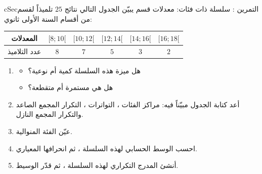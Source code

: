 \documentclass[12pt,a4paper]{article}
\newenvironment{BOX}[2]{\begin{otherlanguage}{english}\begin{arbox}{#1}{#2}}{\end{arbox}\end{otherlanguage}}
\newcounter{exo}
\newenvironment{tamrin}[1]{\stepcounter{exo}\begin{BOX}{cSec}{التمرين \theexo: #1}}{\end{BOX}}
\newenvironment{sq}{\begin{itemize}[leftmargin=2.4em,itemsep=3pt]}{\end{itemize}}
\newcommand{\qa}{\item[(أ)]}\newcommand{\qb}{\item[(ب)]}\newcommand{\qc}{\item[(جـ)]}\newcommand{\qd}{\item[(د)]}\newcommand{\qe}{\item[(هـ)]}
\begin{document}
\begin{tamrin}{سلسلة ذات فئات: معدلات قسم}
يبيّن الجدول التالي نتائج $25$ تلميذاً لقسم من أقسام السنة الأولى ثانوي:
\begin{center}
\renewcommand{\arraystretch}{1.45}
\begin{tabular}{|c|c|c|c|c|c|}\hline
\cellcolor{cSec!12}المعدلات & $[8;10[$ & $[10;12[$ & $[12;14[$ & $[14;16[$ & $[16;18[$\\\hline
\cellcolor{cSec!12}عدد التلاميذ & $8$ & $7$ & $5$ & $3$ & $2$\\\hline
\end{tabular}
\end{center}
\begin{enumerate}
\item
\begin{sq}
\qa هل ميزة هذه السلسلة كمية أم نوعية؟
\qb هل هي مستمرة أم متقطعة؟
\end{sq}
\item أعد كتابة الجدول مبيّناً فيه: مراكز الفئات ، التواترات ، التكرار المجمع الصاعد والتكرار المجمع النازل.
\item عيّن الفئة المنوالية.
\item احسب الوسط الحسابي لهذه السلسلة ، ثم انحرافها المعياري.
\item أنشئ المدرج التكراري لهذه السلسلة ، ثم قدّر الوسيط.
\end{enumerate}
\end{tamrin}
\end{document}
